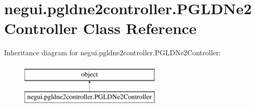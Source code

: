 \hypertarget{classnegui_1_1pgldne2controller_1_1PGLDNe2Controller}{}\section{negui.\+pgldne2controller.\+P\+G\+L\+D\+Ne2\+Controller Class Reference}
\label{classnegui_1_1pgldne2controller_1_1PGLDNe2Controller}
Inheritance diagram for negui.\+pgldne2controller.\+P\+G\+L\+D\+Ne2\+Controller\+:\begin{figure}[H]
\begin{center}
\leavevmode
\includegraphics[height=2.000000cm]{classnegui_1_1pgldne2controller_1_1PGLDNe2Controller}
\end{center}
\end{figure}
